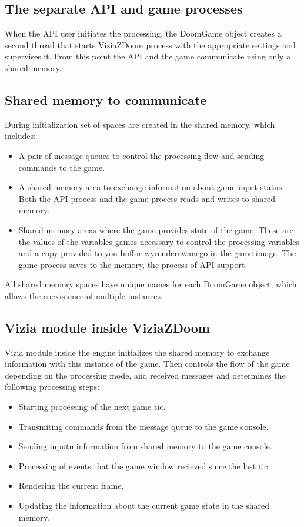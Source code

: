 \subsection{The separate API and game processes}\label{sec:architecture_separate_processes}

When the API user initiates the processing, the DoomGame object creates a second thread that starts ViziaZDoom process with the appropriate settings and supervises it. From this point the API and the game communicate using only a shared memory.


\subsection{Shared memory to communicate}\label{sec:architecture_shared_memory}

During initialization set of spaces are created in the shared memory, which includes:
    \begin{itemize}
    \item A pair of message queues to control the processing flow and sending commands to the game.
    \item A shared memory area to exchange information about game input status. Both the API process and the game process reads and writes to shared memory.
    \item Shared memory areas where the game provides state of the game. These are the values of the variables games necessary to control the processing variables and a copy provided to you buffor wyrenderowanego in the game image. The game process saves to the memory, the process of API support.
    \end{itemize}
All shared memory spaces have unique names for each DoomGame object, which allows the coexistence of multiple instances.


\subsection{Vizia module inside ViziaZDoom}\label{sec:architecture_inside_viziazdoom}

Vizia module inside the engine initializes the shared memory to exchange information with this instance of the game. Then controls the flow of the game depending on the processing mode, and received messages and determines the following processing steps:

    \begin{itemize}
    \item Starting processing of the next game tic.
    \item Transmiting commands from the message queue to the game console.
    \item Sending inputu information from shared memory to the game console.
    \item Processing of events that the game window recieved since the last tic.
    \item Rendering the current frame.
    \item Updating the information about the current game state in the shared memory.
    \end{itemize}

